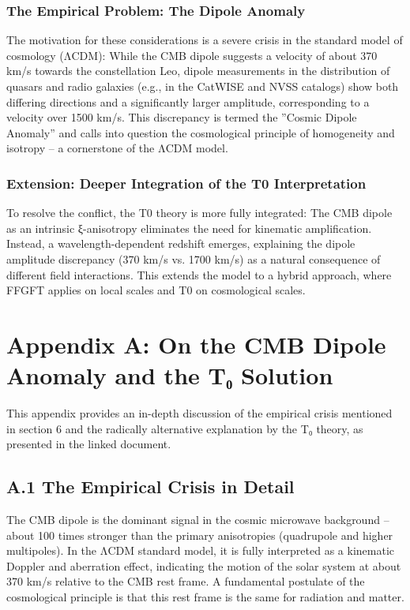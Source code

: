 	\subsubsection*{The Empirical Problem: The Dipole Anomaly}
	
	The motivation for these considerations is a severe crisis in the standard model of cosmology (ΛCDM): While the CMB dipole suggests a velocity of about 370 km/s towards the constellation Leo, dipole measurements in the distribution of quasars and radio galaxies (e.g., in the CatWISE and NVSS catalogs) show both differing directions and a significantly larger amplitude, corresponding to a velocity over 1500 km/s. This discrepancy is termed the ''Cosmic Dipole Anomaly'' and calls into question the cosmological principle of homogeneity and isotropy – a cornerstone of the ΛCDM model.
	
	\subsubsection*{Extension: Deeper Integration of the T0 Interpretation}
	To resolve the conflict, the T0 theory is more fully integrated: The CMB dipole as an intrinsic ξ-anisotropy eliminates the need for kinematic amplification. Instead, a wavelength-dependent redshift emerges, explaining the dipole amplitude discrepancy (370 km/s vs. 1700 km/s) as a natural consequence of different field interactions. This extends the model to a hybrid approach, where FFGFT applies on local scales and T0 on cosmological scales.
	
	\section*{Appendix A: On the CMB Dipole Anomaly and the T₀ Solution}
	
	This appendix provides an in-depth discussion of the empirical crisis mentioned in section 6 and the radically alternative explanation by the T₀ theory, as presented in the linked document.
	
	\subsection*{A.1 The Empirical Crisis in Detail}
	
	The CMB dipole is the dominant signal in the cosmic microwave background – about 100 times stronger than the primary anisotropies (quadrupole and higher multipoles). In the ΛCDM standard model, it is fully interpreted as a kinematic Doppler and aberration effect, indicating the motion of the solar system at about 370 km/s relative to the CMB rest frame. A fundamental postulate of the cosmological principle is that this rest frame is the same for radiation and matter.
	
